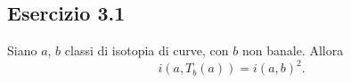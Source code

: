 \subsection*{Esercizio 3.1}
\newcommand{\definef}{
\tikzmath{
function f(\x) {
    if \x < -1 then {
        return 2 / (1 + exp(5));
    } else {
        if \x > 1 then {
            return 2 / (1 + exp(-5));
        } else {
            return 2 / (1 + exp(-\x * 5));
        };
    };
};
}
}
\newcommand{\exerciseIntersectLines}[3]{
\fill[white,name intersections={of={#1} and {#2},total=\t}] {\ifnum \t>0 \foreach \k in {1,...,\t} {(intersection-\k) circle (#3 pt) node[black,cross out,draw,scale=.5,very thick] {}}\fi};
}
\begin{lemma}
Siano $a$, $b$ classi di isotopia di curve, con $b$ non banale. Allora
\[
i(a,T_b(a))=i(a,b)^2.
\]
\end{lemma}
